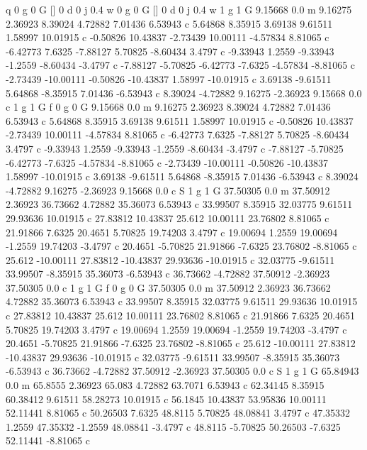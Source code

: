 q
0 g 0 G 
[] 0 d 
0 j 
0.4 w 
0 g 0 G 
[] 0 d 
0 j 
0.4 w 
1 g 1 G 
9.15668 0.0 m 
9.16275 2.36923 
8.39024 4.72882 
7.01436 6.53943 c 
5.64868 8.35915 
3.69138 9.61511 
1.58997 10.01915 c 
-0.50826 10.43837 
-2.73439 10.00111 
-4.57834 8.81065 c 
-6.42773 7.6325 
-7.88127 5.70825 
-8.60434 3.4797 c 
-9.33943 1.2559 
-9.33943 -1.2559 
-8.60434 -3.4797 c 
-7.88127 -5.70825 
-6.42773 -7.6325 
-4.57834 -8.81065 c 
-2.73439 -10.00111 
-0.50826 -10.43837 
1.58997 -10.01915 c 
3.69138 -9.61511 
5.64868 -8.35915 
7.01436 -6.53943 c 
8.39024 -4.72882 
9.16275 -2.36923 
9.15668 0.0 c 
1 g 1 G f 
0 g 0 G 
9.15668 0.0 m 
9.16275 2.36923 
8.39024 4.72882 
7.01436 6.53943 c 
5.64868 8.35915 
3.69138 9.61511 
1.58997 10.01915 c 
-0.50826 10.43837 
-2.73439 10.00111 
-4.57834 8.81065 c 
-6.42773 7.6325 
-7.88127 5.70825 
-8.60434 3.4797 c 
-9.33943 1.2559 
-9.33943 -1.2559 
-8.60434 -3.4797 c 
-7.88127 -5.70825 
-6.42773 -7.6325 
-4.57834 -8.81065 c 
-2.73439 -10.00111 
-0.50826 -10.43837 
1.58997 -10.01915 c 
3.69138 -9.61511 
5.64868 -8.35915 
7.01436 -6.53943 c 
8.39024 -4.72882 
9.16275 -2.36923 
9.15668 0.0 c 
S 
1 g 1 G 
37.50305 0.0 m 
37.50912 2.36923 
36.73662 4.72882 
35.36073 6.53943 c 
33.99507 8.35915 
32.03775 9.61511 
29.93636 10.01915 c 
27.83812 10.43837 
25.612 10.00111 
23.76802 8.81065 c 
21.91866 7.6325 
20.4651 5.70825 
19.74203 3.4797 c 
19.00694 1.2559 
19.00694 -1.2559 
19.74203 -3.4797 c 
20.4651 -5.70825 
21.91866 -7.6325 
23.76802 -8.81065 c 
25.612 -10.00111 
27.83812 -10.43837 
29.93636 -10.01915 c 
32.03775 -9.61511 
33.99507 -8.35915 
35.36073 -6.53943 c 
36.73662 -4.72882 
37.50912 -2.36923 
37.50305 0.0 c 
1 g 1 G f 
0 g 0 G 
37.50305 0.0 m 
37.50912 2.36923 
36.73662 4.72882 
35.36073 6.53943 c 
33.99507 8.35915 
32.03775 9.61511 
29.93636 10.01915 c 
27.83812 10.43837 
25.612 10.00111 
23.76802 8.81065 c 
21.91866 7.6325 
20.4651 5.70825 
19.74203 3.4797 c 
19.00694 1.2559 
19.00694 -1.2559 
19.74203 -3.4797 c 
20.4651 -5.70825 
21.91866 -7.6325 
23.76802 -8.81065 c 
25.612 -10.00111 
27.83812 -10.43837 
29.93636 -10.01915 c 
32.03775 -9.61511 
33.99507 -8.35915 
35.36073 -6.53943 c 
36.73662 -4.72882 
37.50912 -2.36923 
37.50305 0.0 c 
S 
1 g 1 G 
65.84943 0.0 m 
65.8555 2.36923 
65.083 4.72882 
63.7071 6.53943 c 
62.34145 8.35915 
60.38412 9.61511 
58.28273 10.01915 c 
56.1845 10.43837 
53.95836 10.00111 
52.11441 8.81065 c 
50.26503 7.6325 
48.8115 5.70825 
48.08841 3.4797 c 
47.35332 1.2559 
47.35332 -1.2559 
48.08841 -3.4797 c 
48.8115 -5.70825 
50.26503 -7.6325 
52.11441 -8.81065 c 
